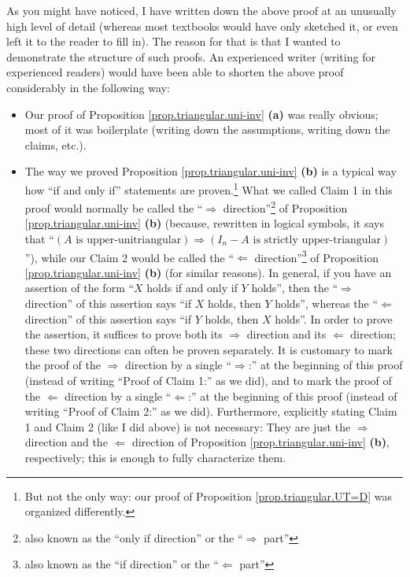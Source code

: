 \documentclass[numbers=enddot,12pt,final,onecolumn,notitlepage]{scrartcl}%
\theoremstyle{definition}
\begin{document}
As you might have noticed, I have written down the above proof at an unusually
high level of detail (whereas most textbooks would have only sketched it, or
even left it to the reader to fill in). The reason for that is that I wanted
to demonstrate the structure of such proofs. An experienced writer (writing
for experienced readers) would have been able to shorten the above proof
considerably in the following way:

\begin{itemize}
\item Our proof of Proposition \ref{prop.triangular.uni-inv} \textbf{(a)} was
really obvious; most of it was boilerplate (writing down the assumptions,
writing down the claims, etc.).

\item The way we proved Proposition \ref{prop.triangular.uni-inv} \textbf{(b)}
is a typical way how ``if and only if'' statements are proven.\footnote{But
not the only way: our proof of Proposition \ref{prop.triangular.UT=D} was
organized differently.} What we called Claim 1 in this proof would normally be
called the ``$\Longrightarrow$ direction''\footnote{also known as the ``only
if direction'' or the ``$\Longrightarrow$ part''} of Proposition
\ref{prop.triangular.uni-inv} \textbf{(b)} (because, rewritten in logical
symbols, it says that ``$\left(  A \text{ is upper-unitriangular} \right)
\Longrightarrow\left(  I_{n} - A \text{ is strictly upper-triangular}\right)
$''), while our Claim 2 would be called the ``$\Longleftarrow$
direction''\footnote{also known as the ``if direction'' or the
``$\Longleftarrow$ part''} of Proposition \ref{prop.triangular.uni-inv}
\textbf{(b)} (for similar reasons). In general, if you have an assertion of
the form ``$X$ holds if and only if $Y$ holds'', then the ``$\Longrightarrow$
direction'' of this assertion says ``if $X$ holds, then $Y$ holds'', whereas
the ``$\Longleftarrow$ direction'' of this assertion says ``if $Y$ holds, then
$X$ holds''. In order to prove the assertion, it suffices to prove both its
$\Longrightarrow$ direction and its $\Longleftarrow$ direction; these two
directions can often be proven separately. It is customary to mark the proof
of the $\Longrightarrow$ direction by a single ``$\Longrightarrow$:'' at the
beginning of this proof (instead of writing ``Proof of Claim 1:'' as we did),
and to mark the proof of the $\Longleftarrow$ direction by a single
``$\Longleftarrow$:'' at the beginning of this proof (instead of writing
``Proof of Claim 2:'' as we did). Furthermore, explicitly stating Claim 1 and
Claim 2 (like I did above) is not necessary: They are just the
$\Longrightarrow$ direction and the $\Longleftarrow$ direction of Proposition
\ref{prop.triangular.uni-inv} \textbf{(b)}, respectively; this is enough to
fully characterize them.


\end{itemize}
\end{document}
